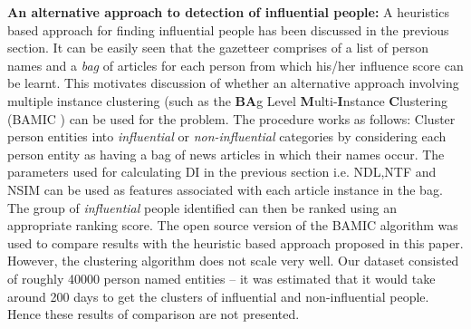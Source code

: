 \noindent \textbf {An alternative approach to detection of influential people: }
A heuristics based approach for finding influential people has been discussed in the previous section. It can be easily seen that the gazetteer comprises of a list of person names and a \emph{bag} of articles for each person from which his/her influence score can be learnt. This motivates discussion of whether an alternative approach involving multiple instance clustering (such as the \textbf{BA}g Level \textbf{M}ulti-\textbf{I}nstance \textbf{C}lustering (BAMIC \cite{zhang2009multi}) can be used for the problem. The procedure works as follows: 
 Cluster person entities into \emph{influential} or \emph{non-influential} categories by considering each person entity as having a bag of news articles in which their names occur.
The parameters used for calculating DI in the previous section i.e. NDL,NTF and NSIM can be used as features associated with each article instance in the bag. The group of \emph{influential} people identified can then be ranked using an appropriate ranking score.
The open source version of the BAMIC algorithm was used to compare results with the heuristic based approach proposed in this paper. However, the clustering algorithm does not scale very well. Our dataset consisted of roughly 40000 person named entities -- it was estimated that it would take around 200 days to get the clusters of influential and non-influential people.  Hence these results of comparison are not presented. 
